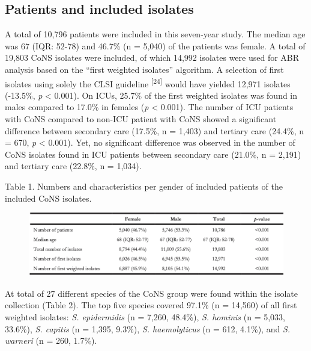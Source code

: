 \documentclass[
]{book}
\begin{document}
\hypertarget{patients-and-included-isolates}{%
\subsection{Patients and included isolates}\label{patients-and-included-isolates}}

A total of 10,796 patients were included in this seven-year study. The median age was 67 (IQR: 52-78) and 46.7\% (n = 5,040) of the patients was female. A total of 19,803 CoNS isolates were included, of which 14,992 isolates were used for ABR analysis based on the ``first weighted isolates'' algorithm. A selection of first isolates using solely the CLSI guideline \textsuperscript{{[}24{]}} would have yielded 12,971 isolates (-13.5\%, \emph{p} \textless{} 0.001). On ICUs, 25.7\% of the first weighted isolates was found in males compared to 17.0\% in females (\emph{p} \textless{} 0.001). The number of ICU patients with CoNS compared to non-ICU patient with CoNS showed a significant difference between secondary care (17.5\%, n = 1,403) and tertiary care (24.4\%, n = 670, \emph{p} \textless{} 0.001). Yet, no significant difference was observed in the number of CoNS isolates found in ICU patients between secondary care (21.0\%, n = 2,191) and tertiary care (22.8\%, n = 1,034).

Table 1. Numbers and characteristics per gender of included patients of the included CoNS isolates.

\begin{figure}

{\centering \includegraphics[width=1\linewidth]{images/07-t01} 

}

\end{figure}

At total of 27 different species of the CoNS group were found within the isolate collection (Table 2). The top five species covered 97.1\% (n = 14,560) of all first weighted isolates: \emph{S. epidermidis} (n = 7,260, 48.4\%), \emph{S. hominis} (n = 5,033, 33.6\%), \emph{S. capitis} (n = 1,395, 9.3\%), \emph{S. haemolyticus} (n = 612, 4.1\%), and \emph{S. warneri} (n = 260, 1.7\%).
\end{document}

